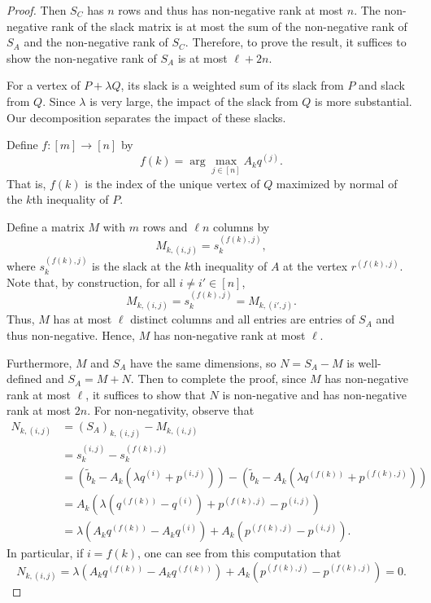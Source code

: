 \documentclass[centering,11pt,reqno]{amsart}
\theoremstyle{definition}
\begin{document}
\begin{proof}
Then $S_{C}$ has $n$ rows and thus has non-negative rank at most $n$. The non-negative rank of the slack matrix is at most the sum of the non-negative rank of $S_{A}$ and the non-negative rank of $S_{C}$. Therefore, to prove the result, it suffices to show the non-negative rank of $S_{A}$ is at most $\ell + 2n$. 

 For a vertex of $P + \lambda Q$, its slack is a weighted sum of its slack from $P$ and slack from $Q$. Since $\lambda$ is very large, the impact of the slack from $Q$ is more substantial. Our decomposition separates the impact of these slacks.
 
 Define $f: [m] \to [n]$ by 
 \[f(k) = \arg\max_{j \in [n]} A_{k} q^{(j)}.\]
 That is, $f(k)$ is the index of the unique vertex of $Q$ maximized by normal of the $k$th inequality of $P$. 

 Define a matrix $M$ with $m$ rows and $\ell n$ columns by 
 \[M_{k,(i,j)} =  s^{(f(k),j)}_{k},\]
 where $s^{(f(k),j)}_{k}$ is the slack at the $k$th inequality of $A$ at the vertex $r^{(f(k),j)}$. Note that, by construction, for all $i \neq i' \in [n]$,
 \[M_{k,(i,j)} = s^{(f(k),j)}_{k}= M_{k,(i',j)}.\]
 Thus, $M$ has at most $\ell$ distinct columns and all entries are entries of $S_{A}$ and thus non-negative. Hence, $M$ has non-negative rank at most $\ell$.

 Furthermore, $M$ and $S_{A}$ have the same dimensions, so $N = S_{A} - M$ is well-defined and $S_{A} = M + N$. Then to complete the proof, since $M$ has non-negative rank at most $\ell$, it suffices to show that $N$ is non-negative and has non-negative rank at most $2n$. For non-negativity, observe that   
 \begin{align*}
     N_{k, (i,j)} &= (S_{A})_{k,(i,j)} - M_{k,(i,j)} \\
     &= s^{(i,j)}_{k} - s^{(f(k),j)}_{k} \\
     &= (\tilde{b}_{k}- A_{k}(\lambda q^{(i)}+p^{(i,j)})) -(\tilde{b}_{k} - A_{k}(\lambda q^{(f(k))} +  p^{(f(k),j)})) \\
     &= A_{k}(\lambda(q^{(f(k))}-q^{(i)})+p^{(f(k),j)}-p^{(i,j)}) \\
     &= \lambda (A_{k}q^{(f(k))} - A_{k}q^{(i)})+A_{k}(p^{(f(k),j)} - p^{(i,j)}).
 \end{align*}
In particular, if $i = f(k)$, one can see from this computation that 
\[N_{k,(i,j)} = \lambda (A_{k}q^{(f(k))} - A_{k}q^{(f(k))})+A_{k}(p^{(f(k),j)} - p^{(f(k),j)}) = 0.\] 
 

\end{proof}
\end{document}
